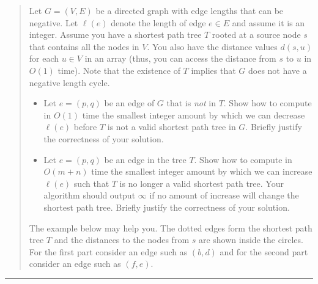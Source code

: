 \documentclass[11pt]{article}
\begin{document}
\begin{quote}
Let $G=(V,E)$ be a directed graph with edge lengths that can be
  negative. Let $\ell(e)$ denote the length of edge $e \in E$ and
  assume it is an integer. Assume you have a shortest path tree $T$
  rooted at a source node $s$ that contains all the nodes in $V$. You
  also have the distance values $d(s,u)$ for each $u \in V$ in an
  array (thus, you can access the distance from $s$ to $u$ in $O(1)$
  time). Note that the existence of $T$ implies that $G$ does not have
  a negative length cycle. 
  \begin{itemize}
  \item  Let $e=(p,q)$ be an edge of $G$ that is {\em not} in
    $T$. Show how to compute in $O(1)$ time the smallest
    integer amount by which we can decrease $\ell(e)$ before $T$
    is not a valid shortest path tree in $G$. Briefly justify the correctness of your solution.
  \item Let $e=(p,q)$ be an edge in the tree $T$. Show how to
  compute in $O(m+n)$ time the smallest integer amount by which we can 
  increase $\ell(e)$ such that $T$ is no longer a valid shortest path tree. 
  Your algorithm should output $\infty$ if no amount of increase will
  change the shortest path tree. Briefly justify the correctness of your solution.
  \end{itemize}
  The example below may help you. The dotted 
 edges form the shortest path tree $T$ and the distances to the nodes
  from $s$ are shown inside the circles. For the first part consider
  an edge such as $(b,d)$ and for the second part consider an edge
  such as $(f,e)$.
\end{quote}
\hrule
\end{document}
